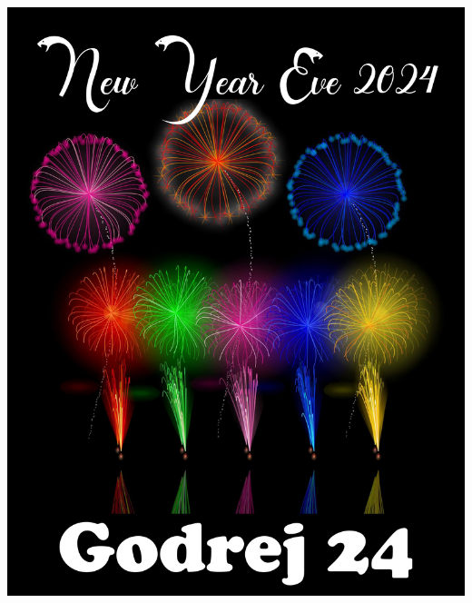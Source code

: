 \documentclass[makeidx, 11pt, oneside, onecolumn, openright, final, svgnames, dvipsnames, extrafontsizes]{memoir}
\begin{document}
\setmainfont{DejaVu Serif}

\begin{center}
\includegraphics[scale=1.0]{first.jpeg}
\end{center}
\end{document}
